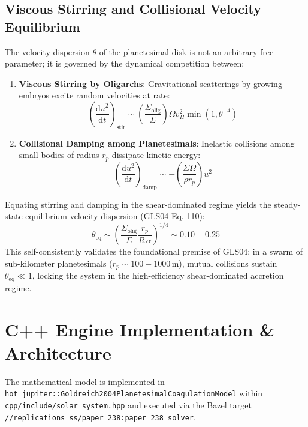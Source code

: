 \documentclass[11pt,a4paper]{article}
\begin{document}
\subsection{Viscous Stirring and Collisional Velocity Equilibrium}
The velocity dispersion $\theta$ of the planetesimal disk is not an arbitrary free parameter; it is governed by the dynamical competition between:
\begin{enumerate}
    \item \textbf{Viscous Stirring by Oligarchs}: Gravitational scatterings by growing embryos excite random velocities at rate:
    \begin{equation}
    \left(\frac{\mathrm{d}u^2}{\mathrm{d}t}\right)_{\text{stir}} \sim \left(\frac{\Sigma_{\text{olig}}}{\Sigma}\right) \Omega v_H^2 \min\left(1, \theta^{-4}\right)
    \end{equation}
    \item \textbf{Collisional Damping among Planetesimals}: Inelastic collisions among small bodies of radius $r_p$ dissipate kinetic energy:
    \begin{equation}
    \left(\frac{\mathrm{d}u^2}{\mathrm{d}t}\right)_{\text{damp}} \sim -\left(\frac{\Sigma \Omega}{\rho r_p}\right) u^2
    \end{equation}
\end{enumerate}
Equating stirring and damping in the shear-dominated regime yields the steady-state equilibrium velocity dispersion (GLS04 Eq. 110):
\begin{equation}
\theta_{\text{eq}} \sim \left(\frac{\Sigma_{\text{olig}}}{\Sigma} \frac{r_p}{R \, \alpha}\right)^{1/4} \sim 0.10 - 0.25
\label{eq:theta_eq}
\end{equation}
This self-consistently validates the foundational premise of GLS04: in a swarm of sub-kilometer planetesimals ($r_p \sim 100-1000\,\text{m}$), mutual collisions sustain $\theta_{\text{eq}} \ll 1$, locking the system in the high-efficiency shear-dominated accretion regime.

\section{C++ Engine Implementation \& Architecture}
The mathematical model is implemented in \texttt{hot\_jupiter::Goldreich2004PlanetesimalCoagulationModel} within \texttt{cpp/include/solar\_system.hpp} and executed via the Bazel target \texttt{//replications\_ss/paper\_238:paper\_238\_solver}.
\end{document}
